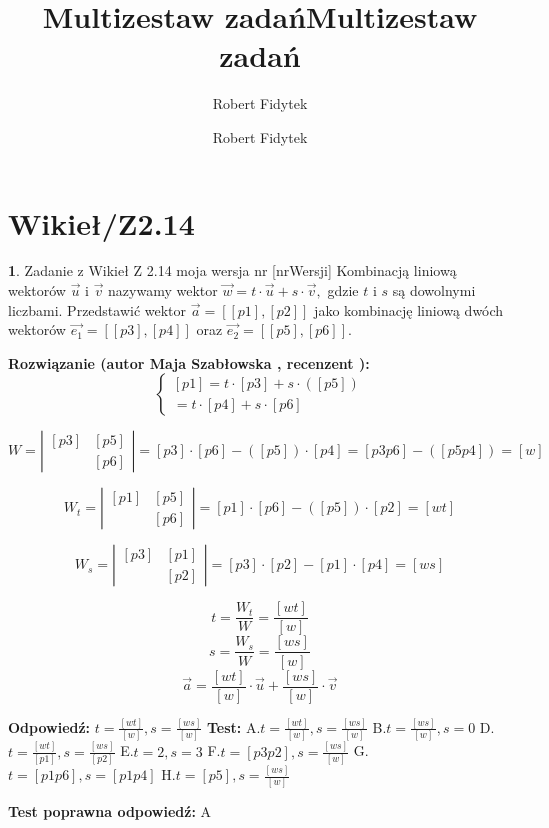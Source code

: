 \documentclass[12pt, a4paper]{article}
\title{Multizestaw zadań}
\author{Robert Fidytek}
\date{}\documentclass[12pt, a4paper]{article}
\title{Multizestaw zadań}
\author{Robert Fidytek}
\date{}
\theoremstyle{definition} %
\newtheorem{zad}{}
\theoremstyle{definition} %
\newtheorem{zad}{}
\newcommand{\kategoria}[1]{\section{#1}} %
\newcommand{\zadStart}[1]{\begin{zad}#1\newline} %
\newcommand{\zadStop}{\end{zad}}   %
\newcommand{\rozwStart}[2]{\noindent \textbf{Rozwiązanie (autor #1 , recenzent #2): }\newline} %
\newcommand{\rozwStop}{\newline}                                            %
\newcommand{\odpStart}{\noindent \textbf{Odpowiedź:}\newline}    %
\newcommand{\odpStop}{\newline}                                             %
\newcommand{\testStart}{\noindent \textbf{Test:}\newline} %
\newcommand{\testStop}{\newline} %
\newcommand{\kluczStart}{\noindent \textbf{Test poprawna odpowiedź:}\newline} %
\newcommand{\kluczStop}{\newline} %
\begin{document}
\maketitle


\kategoria{Wikieł/Z2.14}
\zadStart{Zadanie z Wikieł Z 2.14  moja wersja nr [nrWersji]}
Kombinacją liniową wektorów $\vec{u}$ i $\vec{v}$ nazywamy wektor $\vec{w}=t\cdot\vec{u}+s\cdot\vec{v},$ gdzie $t$ i $s$ są dowolnymi liczbami. Przedstawić wektor $\vec{a}=[[p1], [p2]]$ jako kombinację liniową dwóch wektorów $\vec{e_{1}}=[[p3],[p4]]$ oraz $\vec{e_{2}}=[[p5],[p6]].$
\zadStop

\rozwStart{Maja Szabłowska}{}
$$
\left\{ \begin{array}{ll}
[p1]= t\cdot [p3] + s \cdot ([p5])\\
[p2]= t \cdot [p4] + s \cdot [p6]
\end{array} \right.
$$

$$
W=\left| \begin{array}{ccc}
[p3] & [p5] \\
[p4] & [p6] 
\end{array} \right| = [p3]\cdot[p6]-([p5])\cdot[p4]=[p3p6]-([p5p4])=[w]
$$

$$
W_{t}=\left| \begin{array}{ccc}
[p1] & [p5] \\
[p2] & [p6] 
\end{array} \right| =[p1]\cdot[p6]-([p5])\cdot[p2]=[wt]
$$

$$
W_{s}=\left| \begin{array}{ccc}
[p3] & [p1] \\
[p4] & [p2] 
\end{array} \right| =[p3]\cdot[p2]-[p1]\cdot[p4]=[ws]
$$

$$t=\frac{W_{t}}{W}=\frac{[wt]}{[w]}$$
$$s=\frac{W_{s}}{W}=\frac{[ws]}{[w]}$$
$$\vec{a}=\frac{[wt]}{[w]}\cdot\vec{u}+\frac{[ws]}{[w]}\cdot\vec{v}$$

\rozwStop


\odpStart
$t=\frac{[wt]}{[w]}, s=\frac{[ws]}{[w]}$
\odpStop
\testStart
A.$t=\frac{[wt]}{[w]}, s=\frac{[ws]}{[w]}$
B.$t=\frac{[ws]}{[w]}, s=0$
D.$t=\frac{[wt]}{[p1]}, s=\frac{[ws]}{[p2]}$
E.$t=2, s=3$
F.$t=[p3p2], s=\frac{[ws]}{[w]}$
G.$t=[p1p6], s=[p1p4]$
H.$t=[p5], s=\frac{[ws]}{[w]}$

\testStop
\kluczStart
A
\kluczStop
\end{document}
